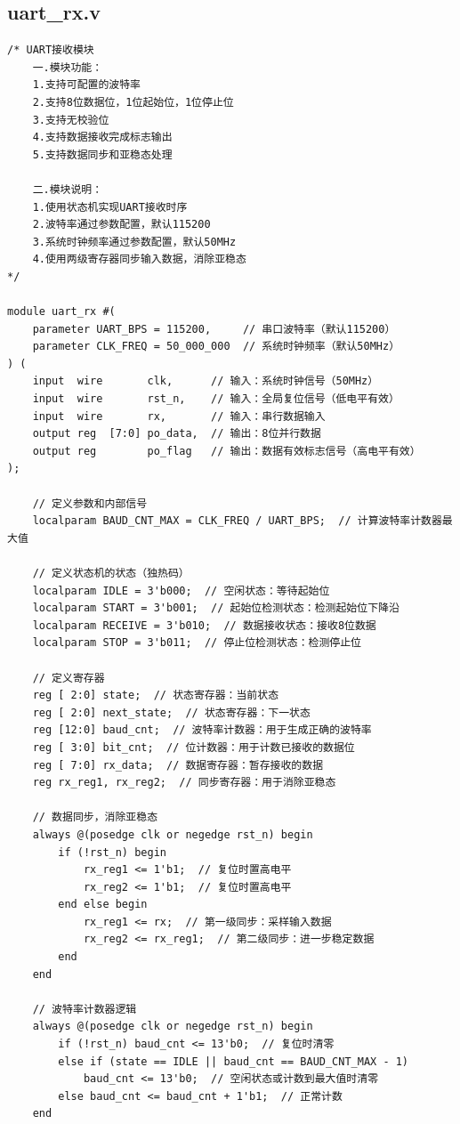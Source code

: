 \documentclass[a4paper,10pt]{article}
\begin{document}
\subsection{uart_rx.v}
\begin{lstlisting}[caption=uart_rx.v]
/* UART接收模块
    一.模块功能：
    1.支持可配置的波特率
    2.支持8位数据位，1位起始位，1位停止位
    3.支持无校验位
    4.支持数据接收完成标志输出
    5.支持数据同步和亚稳态处理

    二.模块说明：
    1.使用状态机实现UART接收时序
    2.波特率通过参数配置，默认115200
    3.系统时钟频率通过参数配置，默认50MHz
    4.使用两级寄存器同步输入数据，消除亚稳态
*/

module uart_rx #(
    parameter UART_BPS = 115200,     // 串口波特率（默认115200）
    parameter CLK_FREQ = 50_000_000  // 系统时钟频率（默认50MHz）
) (
    input  wire       clk,      // 输入：系统时钟信号（50MHz）
    input  wire       rst_n,    // 输入：全局复位信号（低电平有效）
    input  wire       rx,       // 输入：串行数据输入
    output reg  [7:0] po_data,  // 输出：8位并行数据
    output reg        po_flag   // 输出：数据有效标志信号（高电平有效）
);

    // 定义参数和内部信号
    localparam BAUD_CNT_MAX = CLK_FREQ / UART_BPS;  // 计算波特率计数器最大值

    // 定义状态机的状态（独热码）
    localparam IDLE = 3'b000;  // 空闲状态：等待起始位
    localparam START = 3'b001;  // 起始位检测状态：检测起始位下降沿
    localparam RECEIVE = 3'b010;  // 数据接收状态：接收8位数据
    localparam STOP = 3'b011;  // 停止位检测状态：检测停止位

    // 定义寄存器
    reg [ 2:0] state;  // 状态寄存器：当前状态
    reg [ 2:0] next_state;  // 状态寄存器：下一状态
    reg [12:0] baud_cnt;  // 波特率计数器：用于生成正确的波特率
    reg [ 3:0] bit_cnt;  // 位计数器：用于计数已接收的数据位
    reg [ 7:0] rx_data;  // 数据寄存器：暂存接收的数据
    reg rx_reg1, rx_reg2;  // 同步寄存器：用于消除亚稳态

    // 数据同步，消除亚稳态
    always @(posedge clk or negedge rst_n) begin
        if (!rst_n) begin
            rx_reg1 <= 1'b1;  // 复位时置高电平
            rx_reg2 <= 1'b1;  // 复位时置高电平
        end else begin
            rx_reg1 <= rx;  // 第一级同步：采样输入数据
            rx_reg2 <= rx_reg1;  // 第二级同步：进一步稳定数据
        end
    end

    // 波特率计数器逻辑
    always @(posedge clk or negedge rst_n) begin
        if (!rst_n) baud_cnt <= 13'b0;  // 复位时清零
        else if (state == IDLE || baud_cnt == BAUD_CNT_MAX - 1)
            baud_cnt <= 13'b0;  // 空闲状态或计数到最大值时清零
        else baud_cnt <= baud_cnt + 1'b1;  // 正常计数
    end


\end{lstlisting}
\end{document}
